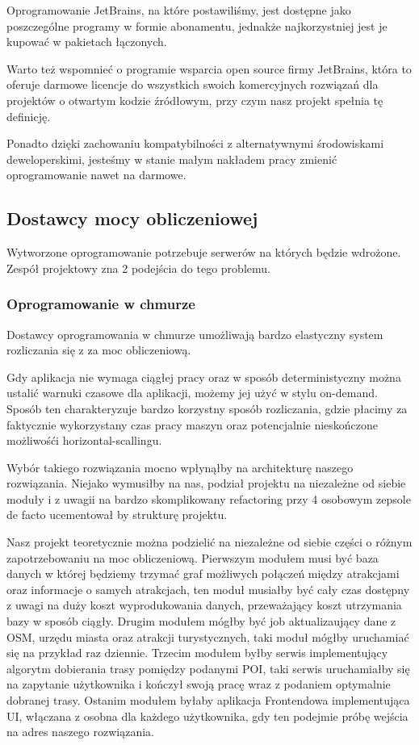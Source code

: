 Oprogramowanie JetBrains, na które postawiliśmy, jest dostępne jako poszczególne programy w formie abonamentu, jednakże najkorzystniej jest je kupować w pakietach łączonych.

Warto też wspomnieć o programie wsparcia open source firmy JetBrains, która to oferuje darmowe licencje do wszystkich swoich komercyjnych rozwiązań dla projektów o otwartym kodzie źródłowym, przy czym nasz projekt spełnia tę definicję.

Ponadto dzięki zachowaniu kompatybilności z alternatywnymi środowiskami deweloperskimi, jesteśmy w stanie małym nakładem pracy zmienić oprogramowanie nawet na darmowe.

\subsection{Dostawcy mocy obliczeniowej}
\label{subsec:dostawcy-mocy-obliczeniowej}
Wytworzone oprogramowanie potrzebuje serwerów na których będzie wdrożone.
Zespół projektowy zna 2 podejścia do tego problemu.

\subsubsection{Oprogramowanie w chmurze}
Dostawcy oprogramowania w chmurze umożliwają bardzo elastyczny system rozliczania się z za moc obliczeniową.

Gdy aplikacja nie wymaga ciągłej pracy oraz w sposób deterministyczny można ustalić warnuki czasowe dla aplikacji, możemy jej użyć w stylu on-demand.
Sposób ten charakteryzuje bardzo korzystny sposób rozliczania, gdzie płacimy za faktycznie wykorzystany czas pracy maszyn oraz potencjalnie nieskończone możliwośći horizontal-scallingu.

Wybór takiego rozwiązania mocno wpłynąłby na architekturę naszego rozwiązania.
Niejako wymusiłby na nas, podział projektu na niezależne od siebie moduły i z uwagii na bardzo skomplikowany refactoring przy 4 osobowym zepsole de facto ucementował by strukturę projektu.

Nasz projekt teoretycznie można podzielić na niezależne od siebie części o różnym zapotrzebowaniu na moc obliczeniową.
Pierwszym modułem musi być baza danych w której będziemy trzymać graf możliwych połączeń między atrakcjami oraz informacje o samych atrakcjach, ten moduł musiałby być cały czas dostępny z uwagi na duży koszt wyprodukowania danych, przeważający koszt utrzymania bazy w sposób ciągły.
Drugim modułem mógłby być job aktualizaujący dane z OSM, urzędu miasta oraz atrakcji turystycznych, taki moduł mógłby uruchamiać się na przykład raz dziennie.
Trzecim modułem byłby serwis implementujący algorytm dobierania trasy pomiędzy podanymi POI, taki serwis uruchamiałby się na zapytanie użytkownika i kończył swoją pracę wraz z podaniem optymalnie dobranej trasy.
Ostanim modułem byłaby aplikacja Frontendowa implementująca UI, włączana z osobna dla każdego użytkownika, gdy ten podejmie próbę wejścia na adres naszego rozwiązania.


